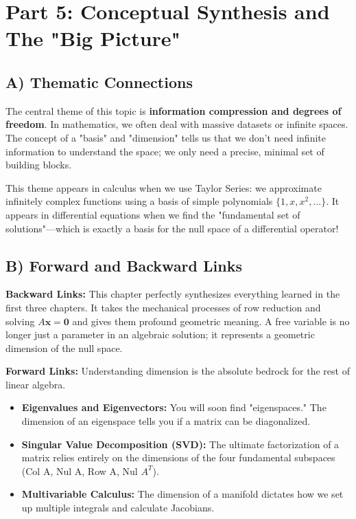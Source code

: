 \documentclass[12pt]{article}
\begin{document}
\newpage
\section{Part 5: Conceptual Synthesis and The "Big Picture"}

\subsection{A) Thematic Connections}
The central theme of this topic is \textbf{information compression and degrees of freedom}. In mathematics, we often deal with massive datasets or infinite spaces. The concept of a "basis" and "dimension" tells us that we don't need infinite information to understand the space; we only need a precise, minimal set of building blocks. 

This theme appears in calculus when we use Taylor Series: we approximate infinitely complex functions using a basis of simple polynomials $\{1, x, x^2, \dots\}$. It appears in differential equations when we find the "fundamental set of solutions"—which is exactly a basis for the null space of a differential operator!

\subsection{B) Forward and Backward Links}
\textbf{Backward Links:} This chapter perfectly synthesizes everything learned in the first three chapters. It takes the mechanical processes of row reduction and solving $A\mathbf{x} = \mathbf{0}$ and gives them profound geometric meaning. A free variable is no longer just a parameter in an algebraic solution; it represents a geometric dimension of the null space.

\textbf{Forward Links:} Understanding dimension is the absolute bedrock for the rest of linear algebra. 
\begin{itemize}
    \item \textbf{Eigenvalues and Eigenvectors:} You will soon find "eigenspaces." The dimension of an eigenspace tells you if a matrix can be diagonalized.
    \item \textbf{Singular Value Decomposition (SVD):} The ultimate factorization of a matrix relies entirely on the dimensions of the four fundamental subspaces (Col A, Nul A, Row A, Nul $A^T$).
    \item \textbf{Multivariable Calculus:} The dimension of a manifold dictates how we set up multiple integrals and calculate Jacobians.
\end{itemize}
\end{document}
